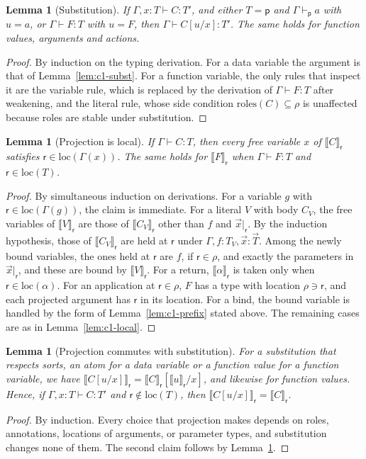 \documentclass[11pt]{report}
\theoremstyle{plain}
\newtheorem{lemma}[theorem]{Lemma}
\theoremstyle{definition}
\theoremstyle{remark}
\newcommand{\pp}{\mathsf{p}}
\newcommand{\rr}{\mathsf{r}}
\newcommand{\roles}[1]{\mathrm{roles}(#1)}
\newcommand{\loc}[1]{\mathrm{loc}(#1)}
\newcommand{\proj}[2]{\llbracket #1 \rrbracket_{#2}}
\begin{document}
\begin{lemma}[Substitution]\label{lem:c4-subst}
  If $\Gamma,x{:}T\vdash C:T'$, and either $T=\pp$ and $\Gamma\vdash_\pp a$ with
  $u=a$, or $\Gamma\vdash F:T$ with $u=F$, then $\Gamma\vdash C[u/x]:T'$.  The
  same holds for function values, arguments and actions.
\end{lemma}
\begin{proof}
  By induction on the typing derivation.  For a data variable the argument is
  that of Lemma~\ref{lem:c1-subst}.  For a function variable, the only rules
  that inspect it are the variable rule, which is replaced by the derivation
  of $\Gamma\vdash F:T$ after weakening, and the literal rule, whose side
  condition $\roles{C}\subseteq\rho$ is unaffected because roles are stable
  under substitution.
\end{proof}

\begin{lemma}[Projection is local]\label{lem:c4-local}
  If $\Gamma\vdash C:T$, then every free variable $x$ of $\proj{C}{\rr}$
  satisfies $\rr\in\loc{\Gamma(x)}$.  The same holds for $\proj{F}{\rr}$ when
  $\Gamma\vdash F:T$ and $\rr\in\loc{T}$.
\end{lemma}
\begin{proof}
  By simultaneous induction on derivations.
  For a variable $g$ with $\rr\in\loc{\Gamma(g)}$, the claim is immediate.
  For a literal $V$ with body $C_V$, the free variables of
  $\proj{V}{\rr}$ are those of $\proj{C_V}{\rr}$ other than $f$ and
  $\vec x|_\rr$.  By the induction hypothesis, those of $\proj{C_V}{\rr}$ are
  held at $\rr$ under $\Gamma,f{:}T_V,\vec x{:}\vec T$.  Among the newly bound
  variables, the ones held at $\rr$ are $f$, if $\rr\in\rho$, and exactly the
  parameters in $\vec x|_\rr$, and these are bound by $\proj{V}{\rr}$.
  For a return, $\proj{\alpha}{\rr}$ is taken only when
  $\rr\in\loc{\alpha}$.  For an application at $\rr\in\rho$, $F$ has a type
  with location $\rho\ni\rr$, and each projected argument has $\rr$ in its
  location.  For a bind, the bound variable is handled by the form of
  Lemma~\ref{lem:c1-prefix} stated above.  The remaining cases are as in
  Lemma~\ref{lem:c1-local}.
\end{proof}

\begin{lemma}[Projection commutes with substitution]\label{lem:c4-psubst}
  For a substitution that respects sorts, an atom for a data variable or a
  function value for a function variable, we have
  $\proj{C[u/x]}{\rr}=\proj{C}{\rr}[\proj{u}{\rr}/x]$, and likewise for
  function values.  Hence, if $\Gamma,x{:}T\vdash C:T'$ and $\rr\notin\loc{T}$,
  then $\proj{C[u/x]}{\rr}=\proj{C}{\rr}$.
\end{lemma}
\begin{proof}
  By induction.  Every choice that projection makes depends on roles,
  annotations, locations of arguments, or parameter types, and substitution
  changes none of them.  The second claim follows by
  Lemma~\ref{lem:c4-local}.
\end{proof}
\end{document}

